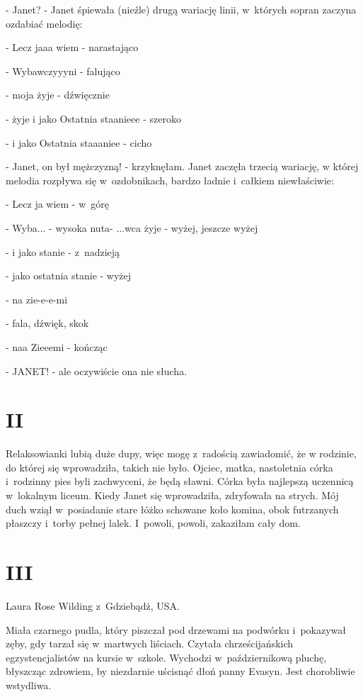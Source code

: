 \documentclass[oneside,polish,12pt,sfheadings]{mwbk}
\begin{document}
- Janet? - Janet śpiewała (nieźle) drugą wariację linii, w~których
sopran zaczyna ozdabiać melodię: 

- Lecz jaaa wiem - narastająco 

- Wybawczyyyni - falująco 

- moja żyje - dźwięcznie 

- żyje i jako Ostatnia staanieee - szeroko 

- i jako Ostatnia staaaniee - cicho

- Janet, on był mężczyzną! - krzyknęłam. Janet zaczęła trzecią wariację,
w której melodia rozpływa się w~ozdobnikach, bardzo ładnie i~całkiem
niewłaściwie: 

- Lecz ja wiem - w~górę

- Wyba... - wysoka nuta- ...wca żyje - wyżej, jeszcze wyżej

- i jako stanie - z~nadzieją

- jako ostatnia stanie - wyżej

- na zie-e-e-mi

- fala, dźwięk, skok

- naa Zieeemi - kończąc

- JANET! - ale oczywiście ona nie słucha.

\chapter{II}

Relaksowianki lubią duże dupy, więc mogę z~radością zawiadomić, że
w rodzinie, do której się wprowadziła, takich nie było. Ojciec, matka,
nastoletnia córka i~rodzinny pies byli zachwyceni, że będą sławni.
Córka była najlepszą uczennicą w~lokalnym liceum. Kiedy Janet się
wprowadziła, zdryfowała na strych. Mój duch wziął w~posiadanie stare
łóżko schowane koło komina, obok futrzanych płaszczy i~torby pełnej
lalek. I~powoli, powoli, zakaziłam cały dom.

\chapter{III}

Laura Rose Wilding z~Gdziebądż, USA.

Miała czarnego pudla, który piszczał pod drzewami na podwórku i~pokazywał
zęby, gdy tarzał się w~martwych liściach. Czytała chrześcijańskich
egzystencjalistów na kursie w~szkole. Wychodzi w~październikową pluchę,
błyszcząc zdrowiem, by niezdarnie uścisnąć dłoń panny Evasyn. Jest
chorobliwie wstydliwa.
\end{document}
